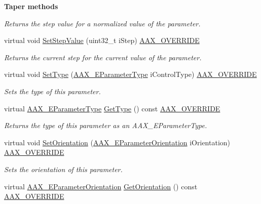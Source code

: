 \begin{Indent}{\bf Taper methods}
\begin{DoxyCompactItemize}
\begin{DoxyCompactList}\small\item\em Returns the step value for a normalized value of the parameter. \end{DoxyCompactList}\item 
virtual void \hyperlink{a00033_a832da5dbb22198976ca7f060b13a6406}{Set\+Step\+Value} (uint32\+\_\+t i\+Step) \hyperlink{a00149_ac2f24a5172689ae684344abdcce55463}{A\+A\+X\+\_\+\+O\+V\+E\+R\+R\+I\+D\+E}
\begin{DoxyCompactList}\small\item\em Returns the current step for the current value of the parameter. \end{DoxyCompactList}\item 
virtual void \hyperlink{a00033_a9e02554bfbcc0b7d2598c57d1e2f186c}{Set\+Type} (\hyperlink{a00206_a4cd0f189daa9a60cf36883c56344bb2e}{A\+A\+X\+\_\+\+E\+Parameter\+Type} i\+Control\+Type) \hyperlink{a00149_ac2f24a5172689ae684344abdcce55463}{A\+A\+X\+\_\+\+O\+V\+E\+R\+R\+I\+D\+E}
\begin{DoxyCompactList}\small\item\em Sets the type of this parameter. \end{DoxyCompactList}\item 
virtual \hyperlink{a00206_a4cd0f189daa9a60cf36883c56344bb2e}{A\+A\+X\+\_\+\+E\+Parameter\+Type} \hyperlink{a00033_a0a7163ae07746260e3f6be4a6c974e4c}{Get\+Type} () const \hyperlink{a00149_ac2f24a5172689ae684344abdcce55463}{A\+A\+X\+\_\+\+O\+V\+E\+R\+R\+I\+D\+E}
\begin{DoxyCompactList}\small\item\em Returns the type of this parameter as an A\+A\+X\+\_\+\+E\+Parameter\+Type. \end{DoxyCompactList}\item 
virtual void \hyperlink{a00033_a99f0a049099f10a0b2e71329a3d75e9a}{Set\+Orientation} (\hyperlink{a00206_a52f91d1c14aa5dceedabfb9d2de31bf0}{A\+A\+X\+\_\+\+E\+Parameter\+Orientation} i\+Orientation) \hyperlink{a00149_ac2f24a5172689ae684344abdcce55463}{A\+A\+X\+\_\+\+O\+V\+E\+R\+R\+I\+D\+E}
\begin{DoxyCompactList}\small\item\em Sets the orientation of this parameter. \end{DoxyCompactList}\item 
virtual \hyperlink{a00206_a52f91d1c14aa5dceedabfb9d2de31bf0}{A\+A\+X\+\_\+\+E\+Parameter\+Orientation} \hyperlink{a00033_a892d8a5a49ead3b3f922831a46744899}{Get\+Orientation} () const \hyperlink{a00149_ac2f24a5172689ae684344abdcce55463}{A\+A\+X\+\_\+\+O\+V\+E\+R\+R\+I\+D\+E}

\end{DoxyCompactItemize}
\end{Indent}
